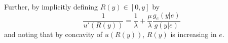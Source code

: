 Further, by implicitly defining $R(y)\in[0,y]$ by 
\[
    \frac{1}{u'(R(y))}=\frac{1}{\lambda}+\frac{\mu}{\lambda}\frac{g_e(y|e)}{g(y|e)}
\]
and noting that by concavity of $u(R(y))$, $R(y)$ is increasing in $e$. 
\printbibliography%
\listoftodos%
